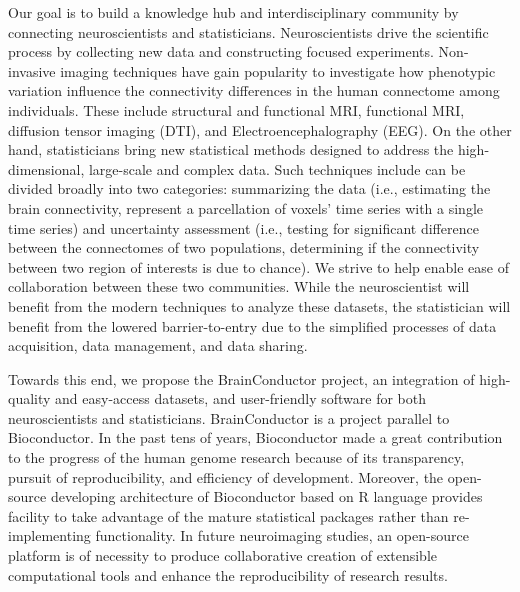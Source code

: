 \documentclass{nature}
\begin{document}
Our goal is to %
build a knowledge hub and interdisciplinary community by connecting
neuroscientists and statisticians.  Neuroscientists 
drive the scientific process by collecting new data and constructing focused
experiments. Non-invasive imaging techniques have gain popularity to 
investigate how phenotypic variation
influence the connectivity differences in the human
connectome among individuals\cite{sporns2005human,sporns2011human}. These include structural and functional MRI,
functional MRI, diffusion tensor imaging (DTI), and Electroencephalography
(EEG).
On
the other hand, statisticians bring new statistical methods
designed to address the high-dimensional, large-scale and complex
data. Such techniques include can be divided broadly into
two categories:
summarizing the data (i.e., estimating the brain connectivity, represent
a parcellation of voxels' time series with a single time series) 
and uncertainty assessment (i.e., testing for significant difference
between the connectomes of two populations, determining if the 
connectivity between two region of interests is due to chance).
We strive to help enable ease of collaboration between these two communities. 
While the neuroscientist will benefit from the modern techniques to
analyze these datasets, the statistician 
will benefit from the lowered barrier-to-entry
due to the  simplified processes of data acquisition, data management, and data
sharing. 


Towards this end, we propose the BrainConductor project, an integration of
high-quality and easy-access datasets, and user-friendly software for both
neuroscientists and statisticians. BrainConductor is a project parallel to
Bioconductor. In the past tens of years, Bioconductor\cite{gentleman2004bioconductor} made a great contribution to the progress of
the human genome research because of its transparency, pursuit of
reproducibility, and efficiency of development. Moreover, the open-source
developing architecture of Bioconductor based on R language provides facility to
take advantage of the mature statistical packages rather than re-implementing
functionality. In future neuroimaging studies, an open-source platform is of
necessity to produce collaborative creation of extensible computational tools
and enhance the reproducibility of research results.
\end{document}
